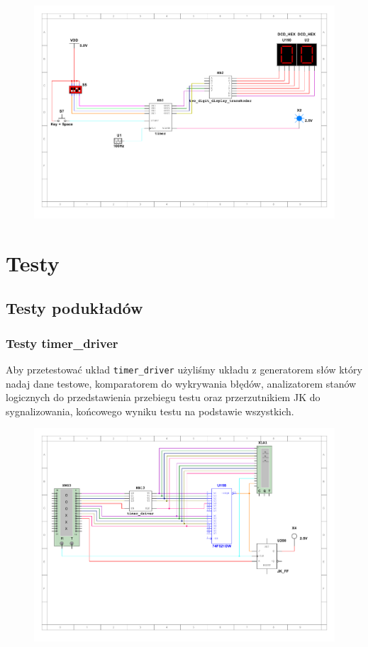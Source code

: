 \documentclass[a4paper]{article}
\begin{document}
\begin{figure}[H]
    \centering
    \includegraphics[width=\textwidth]{showup_scheme.pdf}
\end{figure}


\pagebreak
\section{Testy}
\subsection{Testy podukładów}
\subsubsection{Testy timer\_driver}
Aby przetestować układ \verb|timer_driver| użyliśmy układu z generatorem słów który nadaj dane testowe,
komparatorem do wykrywania błędów, analizatorem stanów logicznych do przedstawienia przebiegu testu oraz
przerzutnikiem JK do sygnalizowania, końcowego wyniku testu na podstawie wszystkich.

\begin{figure}[H]
    \centering
    \includegraphics[width=\textwidth]{component_tests_driver.pdf}
\end{figure}
\end{document}
